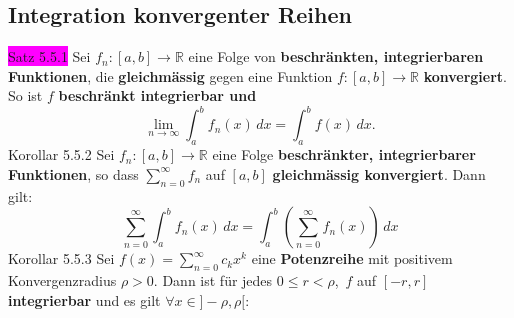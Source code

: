 \documentclass[landscape, 10pt]{article}
\newcommand{\R}{\mathbb{R}}
\begin{document}
\begin{multicols}{3}
       \subsection{Integration konvergenter Reihen}
              \colorbox{magenta}{Satz 5.5.1} 
                     Sei \textcolor{NavyBlue}{
                     $f_n:[a,b]\longrightarrow\R$} 
                     eine Folge von \textbf{beschränkten, 
                     integrierbaren Funktionen}, 
                     die \textbf{gleichmässig} gegen 
                     eine Funktion 
                     \textcolor{NavyBlue}{
                     $f:[a,b]\longrightarrow\R$} 
                     \textbf{konvergiert}.
                     So ist \textcolor{NavyBlue}{$f$} 
                     \textbf{beschränkt integrierbar und} 
                     \begin{equation*}
                            \lim\limits_{n\to\infty}\int_a^bf_n(x)\,dx
                            =\int_a^bf(x)\,dx.
                     \end{equation*}
              \colorbox{BurntOrange}{Korollar 5.5.2} 
                     Sei \textcolor{NavyBlue}{
                     $f_n:[a,b]\longrightarrow\R$} eine Folge 
                     \textbf{beschränkter, integrierbarer 
                     Funktionen}, so dass 
                     \textcolor{NavyBlue}{
                     $\sum_{n=0}^\infty f_n$} auf 
                     \textcolor{NavyBlue}{$[a,b]$}
                     \textbf{gleichmässig konvergiert}. 
                     Dann gilt: 
                     \begin{equation*}
                           \sum_{n=0}^\infty\int_a^bf_n(x)\,dx
                            =\int_a^b(\sum_{n=0}^
                            \infty f_n(x))\,dx 
                     \end{equation*}
              \colorbox{BurntOrange}{Korollar 5.5.3} 
                     Sei \textcolor{NavyBlue}{
                     $f(x)=\sum_{n=0}^\infty c_kx^k$} 
                     eine \textbf{Potenzreihe} 
                     mit positivem Konvergenzradius 
                     \textcolor{NavyBlue}{$\rho>0$}. 
                     Dann ist für jedes 
                     \textcolor{NavyBlue}{$0\leqslant r<\rho$},\,
                     \textcolor{NavyBlue}{$f$} 
                     auf \textcolor{NavyBlue}{$[-r,r]$}
                     \textbf{integrierbar} und es gilt 
                     \textcolor{NavyBlue}{
                     $\forall x\in]-\rho,\rho[$}:
                     \begin{equation*}

\end{equation*}
\end{multicols}
\end{document}
